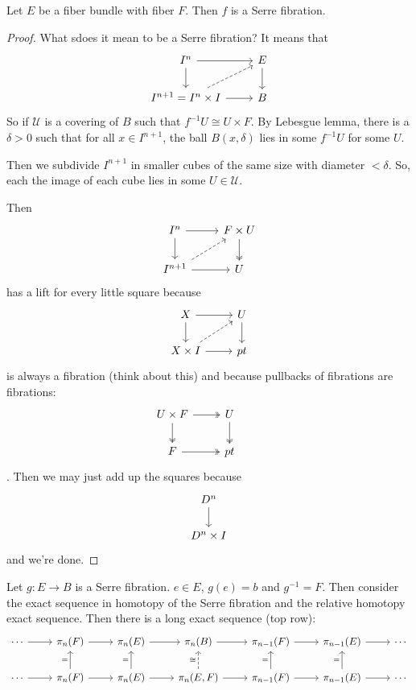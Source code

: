 \documentclass{article}
\newcommand{\Uc}{\mathcal{U}}
\begin{document}
\begin{prop}
	Let $E$ be a fiber bundle with fiber $F$. Then $f$ is a Serre fibration.
\end{prop}
\begin{proof}
	What sdoes it mean to be a Serre fibration? It means that
	\[\begin{tikzcd}
		I^n\arrow[r]\arrow[d]&E\arrow[d]\\
		I^{n+1}=I^n\times I\arrow[r]\arrow[ur,dashed]&B
	\end{tikzcd}\]
	So if $\Uc$ is a covering of $B$ such that $f^{-1}U\cong U\times F$. By Lebesgue lemma, there is a $\delta>0$ such that for all $x\in I^{n+1}$, the ball $B(x,\delta)$ lies in some $f^{-1}U$ for some $U$.
	
	Then we subdivide $I^{n+1}$ in smaller cubes of the same size with diameter $<\delta$. So, each the image of each cube lies in some $U\in\Uc$.
	
	Then
	\[\begin{tikzcd}
		I^n\arrow[d]\arrow[r]&F\times U\arrow[d,two heads]\\
		I^{n+1}\arrow[r]\arrow[ur,dashed]&U
	\end{tikzcd}\]
	has a lift for every little square because
	\[\begin{tikzcd}
		X\arrow[r]\arrow[d]&U\arrow[d]\\
		X\times I\arrow[r]\arrow[ur,dashed]&pt
	\end{tikzcd}\]
	is always a fibration {\color{orange}(think about this)} and because pullbacks of fibrations are fibrations:
	\[\begin{tikzcd}
		U\times F\arrow[r,two heads]\arrow[d,two heads]&U\arrow[d,two heads]&\\
		F\arrow[r,two heads]&pt
	\end{tikzcd}\].
	Then we may just add up the squares because
	\[\begin{tikzcd}
		D^n\arrow[d]\\
		D^n\times I
	\end{tikzcd}\]
	and we're done.
\end{proof}
\begin{prop}\label{thm:serre-fibrations-lectures}
	Let $g:E\to B$ is a Serre fibration. $e\in E$, $g(e)= b$ and $g^{-1}=F$. Then consider the exact sequence in homotopy of the Serre fibration and the relative homotopy exact sequence. Then there is a long exact sequence (top row):
	\[\begin{tikzcd}
		\cdots\arrow[r]&\pi_n(F)\arrow[r]&\pi_n(E)\arrow[r]&\pi_n(B)\arrow[r]&\pi_{n-1}(F)\arrow[r]&\pi_{n-1}(E)\arrow[r]&\cdots\\
		\cdots\arrow[r]&\pi_n(F)\arrow[r]\arrow[u,"="]&\pi_n(E)\arrow[r]\arrow[u,"="]&\pi_n(E,F)\arrow[r]\arrow[u,"\cong",dashed]&\pi_{n-1}(F)\arrow[r]\arrow[u,"="]&\pi_{n-1}(E)\arrow[r]\arrow[u,"="]&\cdots
	\end{tikzcd}\]
\end{prop}
\end{document}
